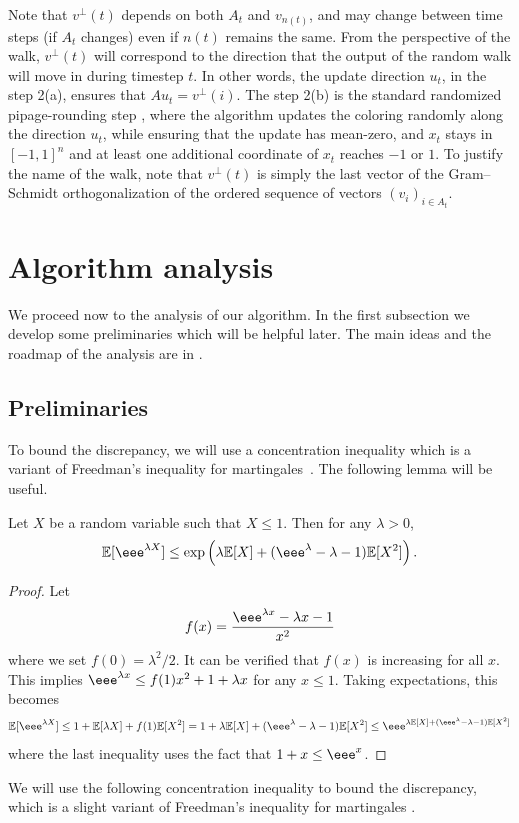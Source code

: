 \documentclass{toc}
\newcommand\E{\mathbb{E}}
\begin{document}
Note that $v^{\perp}(t)$ depends on both $A_t$ and $v_{n(t)}$, and may change
between time steps (if $A_t$ changes) even if $n(t)$ remains the same. {}From the perspective of the
walk, $v^{\perp}(t)$ will correspond to the direction that the output of the
random walk will move in during timestep $t$. In other words, the update direction $u_t$, in the step 2(a),
ensures that $A u_t = v^{\perp}(i)$.  The step 2(b) is the standard randomized pipage-rounding step \cite{Srinivasan01,GKPS06}, where the algorithm updates the coloring randomly along the direction $u_t$, while ensuring that the update has mean-zero, and $x_t$ stays in $[-1,1]^n$ and at least one additional coordinate of $x_t$ reaches $-1$ or $1$.
To justify the name of the walk,
note that $v^\perp(t)$ is simply the last vector of the Gram--Schmidt
orthogonalization of the ordered sequence of vectors $(v_i)_{i \in A_t}$.


\section{Algorithm analysis}
\label{sec:analysis}

We proceed now to the analysis of our algorithm. In the first subsection we develop some preliminaries which will be helpful later.
The main ideas and the roadmap of the analysis are in .
\subsection{Preliminaries}
\label{sec:prel}
To bound the discrepancy, we will use a concentration inequality which is a variant of Freedman's inequality for martingales~\cite{Freedman}. The following lemma will be useful.

\begin{lemma}
\label{lem:prel1}
Let $X$ be a random variable such that $X\le 1$. Then for any $\lambda>0$,
\[ \E[\eee^{\lambda X}] \le \exp\left(\lambda \E[X] +  (\eee^{\lambda} -\lambda-1 )\E[X^2]\right).\]
\end{lemma}

\begin{proof}
  Let
  \[
    f(x) = \frac{\eee^{\lambda x} - \lambda x - 1}{x^2}
  \]
  where we set $f(0)=\lambda^2/2$. It can be verified that $f(x)$ is
  increasing for all $x$.  This implies
  $\eee^{\lambda x} \leq f(1)x^2 + 1 + \lambda x$ for any $x \le 1$.
  Taking expectations, this becomes
\[ \E[\eee^{\lambda X}] \leq  1+\E[\lambda X]+f(1)\E [X^2]
 =  1+\lambda\E[ X]+(\eee^{\lambda} -\lambda-1 )\E [X^2]
 \le   \eee^{\lambda \E [X] +(\eee^{ \lambda} -\lambda-1 )\E [X^2]} \]
where the last inequality uses the fact that $1+x\le \eee^x$.
\end{proof}
We will use the following concentration inequality to bound the discrepancy, which is a slight variant of Freedman's inequality for martingales \cite{Freedman}.
\end{document}
